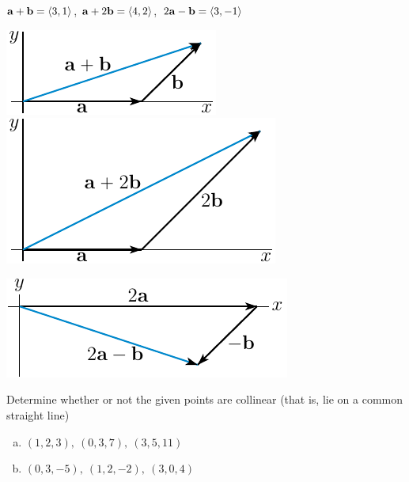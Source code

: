 \begin{solution}
$\mathbf{a}+\mathbf{b}=\left< 3,1\right> $, $\mathbf{a}+2\mathbf{b}=\left< 4,2\right> $,\ 
$2\mathbf{a}-\mathbf{b}=\left< 3,-1\right> $

\begin{center}
     \includegraphics{fig/add1.pdf}\qquad
     \includegraphics{fig/add2.pdf}
\end{center}
\begin{center}
     \includegraphics{fig/add3.pdf}
\end{center}

\end{solution}

\begin{question}
Determine whether or not the given points are collinear (that is, 
lie on a common straight line)
\begin{enumerate}[(a)]
\item
 $(1,2,3),\ (0,3,7),\ (3,5,11)$

\item
$(0,3,-5),\ (1,2,-2),\ (3,0,4)$
\end{enumerate}
\end{question}

